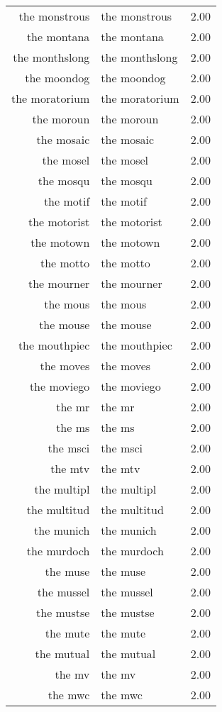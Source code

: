 \begin{table}[ht]
\begin{tabular}{rlr}
  the monstrous & the monstrous & 2.00 \\ 
  the montana & the montana & 2.00 \\ 
  the monthslong & the monthslong & 2.00 \\ 
  the moondog & the moondog & 2.00 \\ 
  the moratorium & the moratorium & 2.00 \\ 
  the moroun & the moroun & 2.00 \\ 
  the mosaic & the mosaic & 2.00 \\ 
  the mosel & the mosel & 2.00 \\ 
  the mosqu & the mosqu & 2.00 \\ 
  the motif & the motif & 2.00 \\ 
  the motorist & the motorist & 2.00 \\ 
  the motown & the motown & 2.00 \\ 
  the motto & the motto & 2.00 \\ 
  the mourner & the mourner & 2.00 \\ 
  the mous & the mous & 2.00 \\ 
  the mouse & the mouse & 2.00 \\ 
  the mouthpiec & the mouthpiec & 2.00 \\ 
  the moves & the moves & 2.00 \\ 
  the moviego & the moviego & 2.00 \\ 
  the mr & the mr & 2.00 \\ 
  the ms & the ms & 2.00 \\ 
  the msci & the msci & 2.00 \\ 
  the mtv & the mtv & 2.00 \\ 
  the multipl & the multipl & 2.00 \\ 
  the multitud & the multitud & 2.00 \\ 
  the munich & the munich & 2.00 \\ 
  the murdoch & the murdoch & 2.00 \\ 
  the muse & the muse & 2.00 \\ 
  the mussel & the mussel & 2.00 \\ 
  the mustse & the mustse & 2.00 \\ 
  the mute & the mute & 2.00 \\ 
  the mutual & the mutual & 2.00 \\ 
  the mv & the mv & 2.00 \\ 
  the mwc & the mwc & 2.00 \\ 

\end{tabular}
\end{table}
